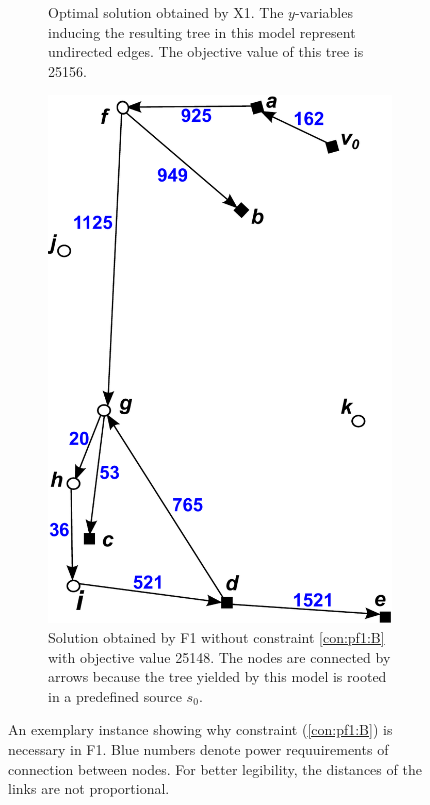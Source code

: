 \begin{figure}[!htb]
\begin{subfigure}[b]{0.4\textwidth}
        \caption{Optimal solution obtained by X1. The $y$-variables inducing the resulting tree in this model represent undirected edges. The objective value of this tree is 25156.}
        \label{fig:BorigSMT}
    \end{subfigure}
    \hfill
    \begin{subfigure}[b]{0.4\textwidth}
        \includegraphics[width=\textwidth]{conBNec2}
        \caption{Solution obtained by F1 without constraint \ref{con:pf1:B} with objective value 25148.
		 The nodes are connected by arrows because the tree yielded by this model is rooted in a predefined source $s_0$.}
        \label{fig:Bpf2}
    \end{subfigure}
    \caption{An exemplary instance showing why constraint (\ref{con:pf1:B}) is necessary in F1.
		Blue numbers denote power requuirements of connection between nodes.
		For better legibility, the distances of the links are not proportional.} 
    \label{fig:BProof}
\end{figure}
